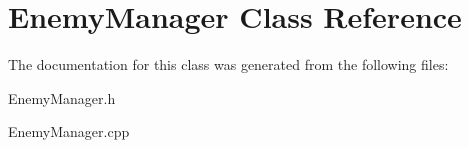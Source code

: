 \hypertarget{class_enemy_manager}{}\section{Enemy\+Manager Class Reference}
\label{class_enemy_manager}


The documentation for this class was generated from the following files\+:\begin{DoxyCompactItemize}
\item 
Enemy\+Manager.\+h\item 
Enemy\+Manager.\+cpp\end{DoxyCompactItemize}
